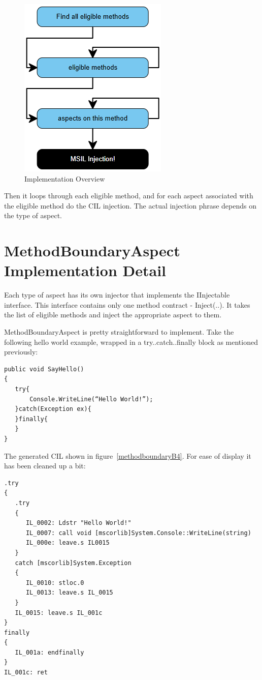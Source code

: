 \begin{figure}[H]
  \includegraphics[scale=1.0]{ImplementationOverview3.PNG}
  \centering
  \caption{Implementation Overview\label{implementation_overview}}
\end{figure}

Then it loops through each eligible method, and for each aspect associated with the eligible method do the CIL injection. The actual injection phrase depends on the type of aspect.

\section{MethodBoundaryAspect Implementation Detail}

Each type of aspect has its own injector that implements the IInjectable interface. This interface contains only one method contract - Inject(..). It takes the list of eligible methods and inject the appropriate aspect to them.

MethodBoundaryAspect is pretty straightforward to implement. Take the following hello world example, wrapped in a try..catch..finally block as mentioned previously:

\begin{lstlisting}[caption={SayHello function}, label=sayhello]
public void SayHello()
{
   try{
       Console.WriteLine(“Hello World!”);
   }catch(Exception ex){
   }finally{
   }
}
\end{lstlisting}

The generated CIL shown in figure~\ref{methodboundaryB4}. For ease of display it has been cleaned up a bit:

\begin{lstlisting}[caption={CIL generated for sample C\# function}, label=methodboundaryB4]
.try
{
   .try
   {
      IL_0002: Ldstr "Hello World!"
      IL_0007: call void [mscorlib]System.Console::WriteLine(string)
      IL_000e: leave.s IL0015
   }
   catch [mscorlib]System.Exception
   {
      IL_0010: stloc.0
      IL_0013: leave.s IL_0015
   }
   IL_0015: leave.s IL_001c
}
finally
{
   IL_001a: endfinally
}
IL_001c: ret
\end{lstlisting}

